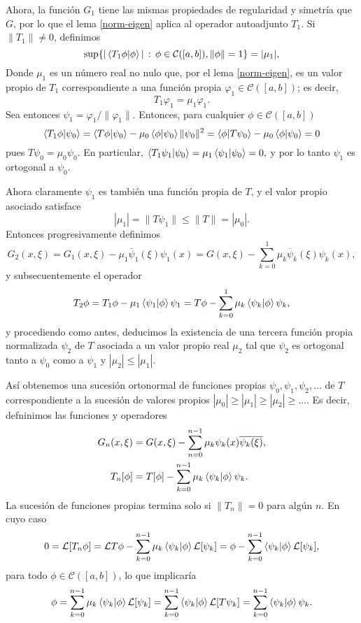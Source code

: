 \documentclass[main.tex]{subfiles}
\begin{document}
Ahora, la función $G_1$ tiene las mismas propiedades de regularidad y simetría que $G$, por lo que el lema \ref{norm-eigen} aplica al operador autoadjunto $T_1$. Si $\|T_1\| \neq 0$, definimos
\[
\sup\{|\braket{T_1\phi|\phi}|\,:\, \phi \in \mathcal{C}([a, b]),\|\phi\|=1\}=|\mu_1|,
\]
Donde $\mu_1$ es un número real no nulo que, por el lema \ref{norm-eigen}, es un valor propio de $T_1$ correspondiente a una función propia $\varphi_1\in\mathcal{C}([a,b])$; es decir,
\[
T_1 \varphi_1 = \mu_1 \varphi_1.
\]
Sea entonces $\psi_1 = \varphi_1 / \|\varphi_1\|$. Entonces, para cualquier $\phi \in \mathcal{C}([a,b])$
\[
\braket{T_1\phi|\psi_0}=\braket{T\phi|\psi_0}-\mu_0\braket{\phi|\psi_0}\|\psi_0\|^{2}=\braket{\phi|T\psi_0} - \mu_0\braket{\phi| \psi_0}= 0
\]
pues $T \psi_0 = \mu_0 \psi_0$. En particular, $\braket{T_1\psi_1|\psi_0}=\mu_1\braket{\psi_1|\psi_0}=0,$ y por lo tanto $\psi_1$ es ortogonal a $\psi_0$.

Ahora claramente $\psi_1$ es también una función propia de $T$, y el valor propio asociado satisface
\[
|\mu_1| = \|T \psi_1\| \leq \|T\| = |\mu_0|.
\]
Entonces progresivamente definimos
\[
G_2(x,\xi)=G_1(x,\xi)-\mu_1\overline{\psi}_1(\xi)\psi_1(x)=G(x,\xi)-\sum_{k=0}^1 \mu_k\overline{\psi}_k(\xi)\psi_k(x),
\]
y subsecuentemente el operador
\[
T_2\phi=T_1\phi-\mu_1\braket{\psi_{1}|\phi}\psi_1=T\phi-\sum_{k=0}^1\mu_k\braket{\psi_k|\phi}\psi_k,
\]
y procediendo como antes, deducimos la existencia de una tercera función propia normalizada $\psi_2$ de $T$ asociada a un valor propio real $\mu_2$ tal que $\psi_2$ es ortogonal tanto a $\psi_0$ como a $\psi_1$ y $|\mu_2| \leq |\mu_1|$.

Así obtenemos una sucesión ortonormal de funciones propias $\psi_0, \psi_1, \psi_2, \dots$ de $T$ correspondiente a la sucesión de valores propios $|\mu_0|\geq|\mu_1|\geq|\mu_2|\geq\dots$.
Es decir, defninimos las funciones y operadores
\begin{align}\label{Green-gen}
  G_{n}(x,\xi)&=G(x,\xi)-\sum_{n=0}^{n-1}\mu_{k}\psi_{k}(x)\overline{\psi_{k}(\xi)},\\
  T_{n}[\phi]&=T[\phi]-\sum_{k=0}^{n-1} \mu_k \braket{\psi_k|\phi}\psi_k.
\end{align}
La sucesión de funciones propias termina solo si $\|T_n\|=0$ para algún $n$. En cuyo caso
\[
 0=\mathcal{L}[T_n\phi]=\mathcal{L}T\phi-\sum_{k=0}^{n-1} \mu_k \braket{\psi_k|\phi}\mathcal{L}[\psi_k]=
  \phi-\sum_{k=0}^{n-1} \braket{\psi_k|\phi}\mathcal{L}[\psi_k],
\]
para todo $\phi\in \mathcal{C}([a,b])$, lo que implicaría
\[
  \phi=\sum_{k=0}^{n-1}\mu_k\braket{\psi_k|\phi}\mathcal{L}[\psi_k]=
  \sum_{k=0}^{n-1}\braket{\psi_k|\phi}\mathcal{L}[T\psi_k]=\sum_{k=0}^{n-1} \braket{\psi_k|\phi}\psi_k.
\]
\end{document}
